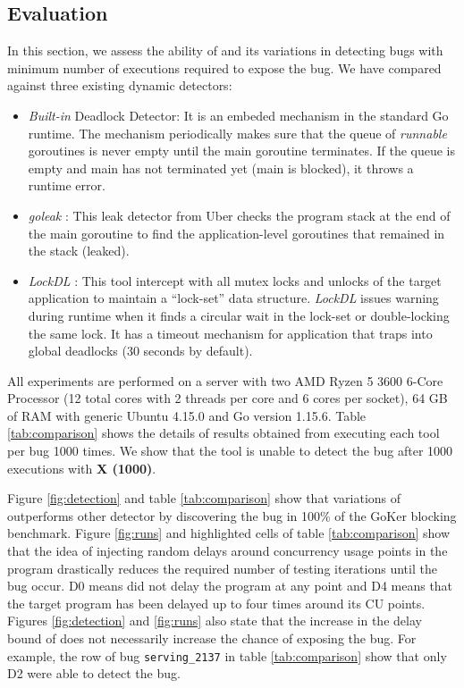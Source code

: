 \subsection{Evaluation}
\label{sec:dl_evaluation}
In this section, we assess the ability of \goat and its variations in detecting bugs with minimum number of executions required to expose the bug.
%
We have compared \goat against three existing dynamic detectors:
\begin{itemize}
  \item \textit{Built-in} Deadlock Detector: It is an embeded mechanism in the standard Go runtime. The mechanism periodically makes sure that the queue of \textit{runnable} goroutines is never empty until the main goroutine terminates. If the queue is empty and main has not terminated yet (\ie main is blocked), it throws a runtime error.
  \item \textit{goleak} \cite{goleak}: This leak detector from Uber checks the program stack at the end of the main goroutine to find the application-level goroutines that remained in the stack (\ie leaked).
  \item \textit{LockDL} \cite{lockdl}: This tool intercept with all mutex locks and unlocks of the target application to maintain a ``lock-set'' data structure. \textit{LockDL} issues warning during runtime when it finds a circular wait in the lock-set or double-locking the same lock. It has a timeout mechanism for application that traps into global deadlocks (30 seconds by default).
\end{itemize}

All experiments are performed on a server with two AMD Ryzen 5 3600 6-Core Processor (12 total cores with 2 threads per core and 6 cores per socket), 64 GB of RAM with generic Ubuntu 4.15.0 and Go version 1.15.6.
%
Table \ref{tab:comparison} shows the details of results obtained from executing each tool per bug 1000 times.
%
We show that the tool is unable to detect the bug after 1000 executions with \textbf{X (1000)}.
%

%
Figure \ref{fig:detection} and table \ref{tab:comparison} show that variations of \goat outperforms other detector by discovering the bug in 100\% of the GoKer blocking benchmark.
%
Figure \ref{fig:runs} and highlighted cells of table \ref{tab:comparison} show that the idea of injecting random delays around concurrency usage points in the program drastically reduces the required number of testing iterations until the bug occur.
%
D0 means \goat did not delay the program at any point and D4 means that the target program has been delayed up to four times around its CU points.
%
Figures \ref{fig:detection} and \ref{fig:runs} also state that the increase in the delay bound of \goat does not necessarily increase the chance of exposing the bug.
%
For example, the row of bug \texttt{serving\_2137} in table \ref{tab:comparison} show that only \goat D2 were able to detect the bug.

